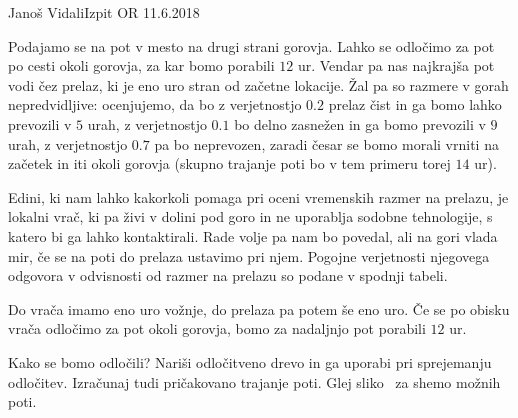 \begin{naloga}{Janoš Vidali}{Izpit OR 11.6.2018}
\begin{vprasanje}[vrac]
Podajamo se na pot v mesto na drugi strani gorovja.
Lahko se odločimo za pot po cesti okoli gorovja,
za kar bomo porabili $12$ ur.
Vendar pa nas najkrajša pot vodi čez prelaz,
ki je eno uro stran od začetne lokacije.
Žal pa so razmere v gorah nepredvidljive:
ocenjujemo, da bo z verjetnostjo $0.2$ prelaz čist
in ga bomo lahko prevozili v $5$ urah,
z ve\-rjet\-nost\-jo $0.1$ bo delno zasnežen in ga bomo prevozili v $9$ urah,
z verjetnostjo $0.7$ pa bo neprevozen,
zaradi česar se bomo morali vrniti na začetek in iti okoli gorovja
(skupno trajanje poti bo v tem primeru torej $14$ ur).

Edini, ki nam lahko kakorkoli pomaga pri oceni vremenskih razmer na prelazu,
je lokalni vrač,
ki pa živi v dolini pod goro in ne uporablja sodobne tehnologije,
s katero bi ga lahko kontaktirali.
Rade volje pa nam bo povedal, ali na gori vlada mir,
če se na poti do prelaza ustavimo pri njem.
Pogojne verjetnosti njegovega odgovora v odvisnosti od razmer na prelazu
so podane v spodnji tabeli.
\begin{center}
\end{center}
Do vrača imamo eno uro vožnje, do prelaza pa potem še eno uro.
Če se po obisku vrača odločimo za pot okoli gorovja,
bomo za nadaljnjo pot porabili $12$ ur.

Kako se bomo odločili?
Nariši odločitveno drevo in ga uporabi pri sprejemanju odločitev.
Izračunaj tudi pričakovano trajanje poti.
Glej sliko~\fig{} za shemo možnih poti.

\begin{slika}
\end{slika}
\end{vprasanje}
\end{naloga}
